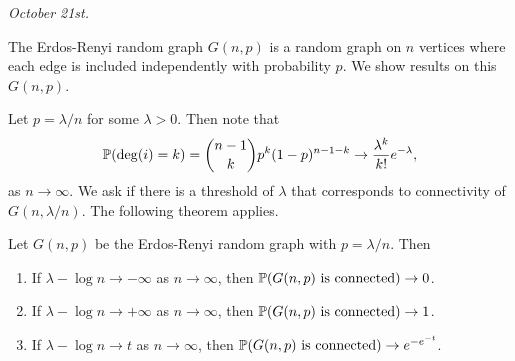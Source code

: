 \textit{October 21st.}

\begin{example}
    The Erdos-Renyi random graph $G(n,p)$ is a random graph on $n$ vertices where each edge is included independently with probability $p$. We show results on this $G(n,p)$.
\end{example}
Let $p = \lambda/n$ for some $\lambda > 0$. Then note that
\begin{align}
    \mathbb{P}(\deg(i) = k) = \binom{n-1}{k}p^{k}(1-p)^{n-1-k} \to \frac{\lambda^{k}}{k!}e^{-\lambda},
\end{align}
as $n \to \infty$. We ask if there is a threshold of $\lambda$ that corresponds to connectivity of $G(n,\lambda/n)$. The following theorem applies.

\begin{theorem}
    Let $G(n,p)$ be the Erdos-Renyi random graph with $p = \lambda/n$. Then
    \begin{enumerate}
        \item If $\lambda - \log n \to -\infty$ as $n \to \infty$, then $\mathbb{P}(G(n,p) \text{ is connected}) \to 0$.
        \item If $\lambda - \log n \to +\infty$ as $n \to \infty$, then $\mathbb{P}(G(n,p) \text{ is connected}) \to 1$.
        \item If $\lambda - \log n \to t$ as $n \to \infty$, then $\mathbb{P}(G(n,p) \text{ is connected}) \to e^{-e^{-t}}$.
    \end{enumerate}
\end{theorem}

